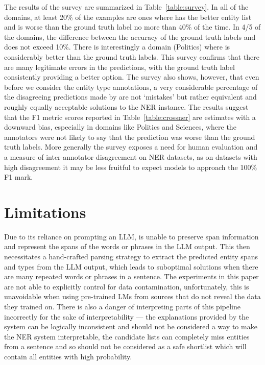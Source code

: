 \documentclass[11pt]{article}
\begin{document}
The results of the survey are summarized in Table~\ref{table:survey}. In all of the domains, at least 20\% of the examples are ones where \toolname has the better entity list and \toolname is worse than the ground truth label no more than 40\% of the time. In 4/5 of the domains, the difference between the accuracy of the ground truth labels and \toolname does not exceed 10\%. There is interestingly a domain (Politics) where \toolname is considerably better than the ground truth labels. This survey confirms that there are many legitimate errors in the \toolname predictions, with the ground truth label consistently providing a better option. The survey also shows, however,  that even before we consider the entity type annotations, a very considerable percentage of the disagreeing predictions made by \toolname are not `mistakes' but rather equivalent and roughly equally acceptable solutions to the NER instance. The results suggest that the F1 metric scores reported in Table~\ref{table:crossner} are estimates with a downward bias, especially in domains like Politics and Sciences, where the annotators were not likely to say that the \toolname prediction was worse than the ground truth labels. More generally the survey exposes a need for human evaluation and a measure of inter-annotator disagreement on NER datasets, as on datasets with high disagreement it may be less fruitful to expect models to approach the 100\% F1 mark.  
\section{Limitations}
Due to its reliance on prompting an LLM, \toolname is unable to preserve span information and represent the spans of the words or phrases in the LLM output. This then necessitates a hand-crafted parsing strategy to extract the predicted entity spans and types from the LLM output, which leads to suboptimal solutions when there are many repeated words or phrases in a sentence. The experiments in this paper are not able to explicitly control for data contamination, unfortunately, this is unavoidable when using pre-trained LMs from sources that do not reveal the data they trained on. There is also a danger of interpreting parts of this pipeline incorrectly for the sake of interpretability --- the explanations provided by the system can be logically inconsistent and should not be considered a way to make the NER system interpretable, the candidate lists can completely miss entities from a sentence and so should not be considered as a safe shortlist which will contain all entities with high probability.  
\end{document}
